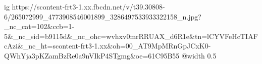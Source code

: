  
 
 
 
 

\ifcmt
  ig https://scontent-frt3-1.xx.fbcdn.net/v/t39.30808-6/265072999_4773908546001899_3286497533933322158_n.jpg?_nc_cat=102&ccb=1-5&_nc_sid=b9115d&_nc_ohc=wvhxv0mrRRUAX_d6R1e&tn=lCYVFeHcTIAFcAzi&_nc_ht=scontent-frt3-1.xx&oh=00_AT9MpMRnGpJCxK0-QWhYja3pKZamBzRe0a9nVIkP4STgmg&oe=61C95B55
  @width 0.5
\fi
